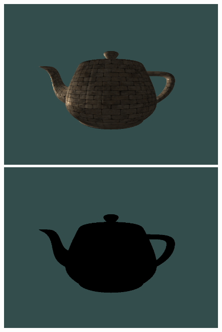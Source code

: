 \documentclass[format=sigconf]{acmart}
\begin{document}
\begin{figure}[h]
  \begin{center}
    \begin{minipage}{.2\textwidth}
      \includegraphics[width=1.0\textwidth]{pass-render.png}
    \end{minipage}
    \begin{minipage}{.2\textwidth}
      \includegraphics[width=1.0\textwidth]{pass-black.png}
    \end{minipage}
    \vskip0.1cm
    \begin{minipage}{.4055\textwidth}

\end{minipage}
\end{center}
\end{figure}
\end{document}
